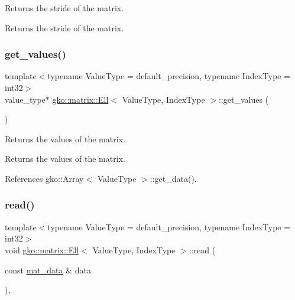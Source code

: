 Returns the stride of the matrix. 

\begin{DoxyReturn}{Returns}
the stride of the matrix. 
\end{DoxyReturn}
\mbox{\label{classgko_1_1matrix_1_1Ell_a4028e9629a7d96a7a483e6ea4a686a1d}} 
\subsubsection{\texorpdfstring{get\+\_\+values()}{get\_values()}}
{\footnotesize\ttfamily template$<$typename Value\+Type = default\+\_\+precision, typename Index\+Type = int32$>$ \\
value\+\_\+type$\ast$ \hyperlink{classgko_1_1matrix_1_1Ell}{gko\+::matrix\+::\+Ell}$<$ Value\+Type, Index\+Type $>$\+::get\+\_\+values (\begin{DoxyParamCaption}{ }\end{DoxyParamCaption})\hspace{0.3cm}{\ttfamily [noexcept]}}



Returns the values of the matrix. 

\begin{DoxyReturn}{Returns}
the values of the matrix. 
\end{DoxyReturn}


References gko\+::\+Array$<$ Value\+Type $>$\+::get\+\_\+data().

\mbox{\label{classgko_1_1matrix_1_1Ell_a2c877d9f7bbc57f97df5ab443954a6fd}} 
\subsubsection{\texorpdfstring{read()}{read()}}
{\footnotesize\ttfamily template$<$typename Value\+Type = default\+\_\+precision, typename Index\+Type = int32$>$ \\
void \hyperlink{classgko_1_1matrix_1_1Ell}{gko\+::matrix\+::\+Ell}$<$ Value\+Type, Index\+Type $>$\+::read (\begin{DoxyParamCaption}\item[{const \hyperlink{structgko_1_1matrix__data}{mat\+\_\+data} \&}]{data }\end{DoxyParamCaption})\hspace{0.3cm}{\ttfamily [override]}, {\ttfamily [virtual]}}




